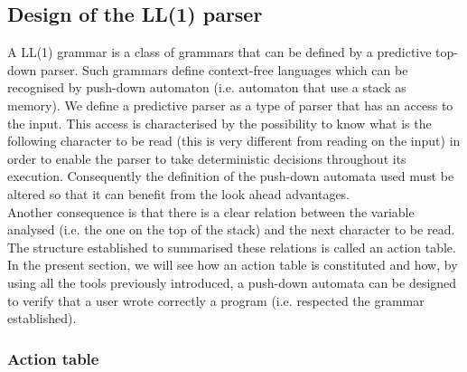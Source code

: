 \documentclass[a4paper,11pt]{article}
\begin{document}
  \subsection{Design of the LL(1) parser}
    A LL(1) grammar is a class of grammars that can be defined by a predictive top-down parser. Such grammars define context-free languages which can be recognised by push-down automaton (i.e. automaton that use a stack as memory). We define a predictive parser as a type of parser that has an access to the input. This access is characterised by the possibility to know what is the following character to be read (this is very different from reading on the input) in order to enable the parser to take deterministic decisions throughout its execution. Consequently the definition of the push-down automata used must be altered so that it can benefit from the look ahead advantages.\\
    Another consequence is that there is a clear relation between the variable analysed (i.e. the one on the top of the stack) and the next character to be read. The structure established to summarised these relations is called an action table.\\
    In the present section, we will see how an action table is constituted and how, by using all the tools previously introduced, a push-down automata can be designed to verify that a user wrote correctly a program (i.e. respected the grammar established).
  
    \subsubsection{Action table}
      
\end{document}
